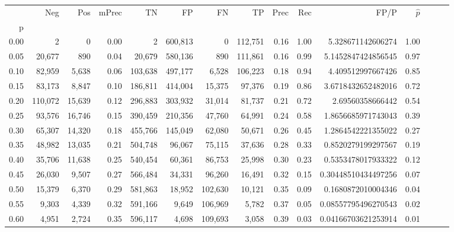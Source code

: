 \begin{tabular}{rrrrrrrrrrrrrrr}
\toprule
{} &      Neg &     Pos & mPrec &       TN &       FP &       FN &       TP &  Prec &   Rec &                    FP/P & $\hat{p}$ \\
p    &          &         &       &          &          &          &          &       &       &                         &           \\
\midrule
0.00 &        2 &       0 &  0.00 &        2 &  600,813 &        0 &  112,751 &  0.16 &  1.00 &       5.328671142606274 &      1.00 \\
0.05 &   20,677 &     890 &  0.04 &   20,679 &  580,136 &      890 &  111,861 &  0.16 &  0.99 &      5.1452847424856545 &      0.97 \\
0.10 &   82,959 &   5,638 &  0.06 &  103,638 &  497,177 &    6,528 &  106,223 &  0.18 &  0.94 &       4.409512997667426 &      0.85 \\
0.15 &   83,173 &   8,847 &  0.10 &  186,811 &  414,004 &   15,375 &   97,376 &  0.19 &  0.86 &      3.6718432652482016 &      0.72 \\
0.20 &  110,072 &  15,639 &  0.12 &  296,883 &  303,932 &   31,014 &   81,737 &  0.21 &  0.72 &        2.69560358666442 &      0.54 \\
0.25 &   93,576 &  16,746 &  0.15 &  390,459 &  210,356 &   47,760 &   64,991 &  0.24 &  0.58 &      1.8656685971743043 &      0.39 \\
0.30 &   65,307 &  14,320 &  0.18 &  455,766 &  145,049 &   62,080 &   50,671 &  0.26 &  0.45 &      1.2864542221355022 &      0.27 \\
0.35 &   48,982 &  13,035 &  0.21 &  504,748 &   96,067 &   75,115 &   37,636 &  0.28 &  0.33 &      0.8520279199297567 &      0.19 \\
0.40 &   35,706 &  11,638 &  0.25 &  540,454 &   60,361 &   86,753 &   25,998 &  0.30 &  0.23 &      0.5353478017933322 &      0.12 \\
0.45 &   26,030 &   9,507 &  0.27 &  566,484 &   34,331 &   96,260 &   16,491 &  0.32 &  0.15 &     0.30448510434497256 &      0.07 \\
0.50 &   15,379 &   6,370 &  0.29 &  581,863 &   18,952 &  102,630 &   10,121 &  0.35 &  0.09 &      0.1680872010004346 &      0.04 \\
0.55 &    9,303 &   4,339 &  0.32 &  591,166 &    9,649 &  106,969 &    5,782 &  0.37 &  0.05 &     0.08557795496270543 &      0.02 \\
0.60 &    4,951 &   2,724 &  0.35 &  596,117 &    4,698 &  109,693 &    3,058 &  0.39 &  0.03 &     0.04166703621253914 &      0.01 \\

\end{tabular}
